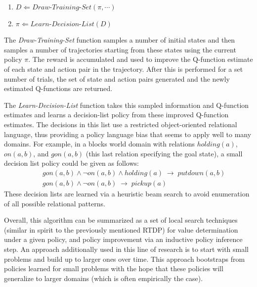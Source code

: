 \begin{enumerate}
\item $D \Leftarrow Draw$-$Training$-$Set( \pi, \cdots )$
\item $\pi \Leftarrow Learn$-$Decision$-$List ( D )$
\end{enumerate}

The \emph{Draw-Training-Set} function samples a number of initial states
and then samples a number of trajectories starting from these states using the
current policy $\pi$.
The reward is accumulated and used to improve the Q-function estimate
of each state and action pair in the trajectory.  After this is
performed for a set number of trials, the set of state and action pairs
generated and the newly estimated Q-functions are returned.

The \emph{Learn-Decision-List} function takes this sampled information and
Q-function estimates and learns a decision-list policy from these
improved Q-function estimates.  The decisions in this list use a
restricted object-oriented relational language, thus
providing a policy language bias that seems to apply well to many
domains.  For example, in a blocks world domain with relations $holding(a)$, $on(a,b)$, and
$gon(a,b)$ (this last relation specifying the goal state), a small decision list policy
could be given as follows: 
\begin{eqnarray*}
& & gon(a,b) \wedge \lnot on(a,b) \wedge holding(a) \; \longrightarrow \; putdown(a,b)  \\
& & gon(a,b) \wedge \lnot on(a,b) \; \longrightarrow \; pickup(a) 
\end{eqnarray*}
These decision lists are learned via a heuristic beam search to
avoid enumeration of all possible relational patterns.

Overall, this algorithm can be summarized as a set of local search techniques (similar in
spirit to the previously mentioned RTDP) for value determination under
a given policy, and policy improvement via an inductive
policy inference step.  An approach additionally used in this line of
research is to start with small problems and build up to larger ones
over time.  This approach bootstraps from policies learned for
small problems with the hope that these policies will generalize to
larger domains (which is often empirically the case).

